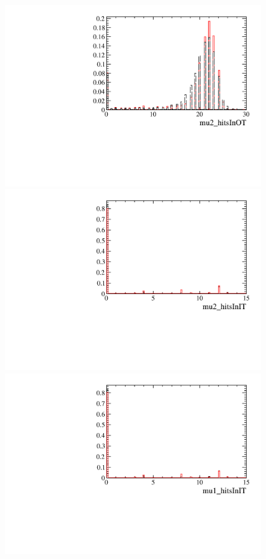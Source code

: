 \documentclass[12pt,a4paper]{article}
\begin{document}
\begin{figure} [htb!]
\begin{center}
\includegraphics[scale=0.20]{figs/mu2_hitsInOTPARTIALptcut.pdf}
\includegraphics[scale=0.20]{figs/mu2_hitsInITPARTIALptcut.pdf}
\includegraphics[scale=0.20]{figs/mu1_hitsInITPARTIALptcut.pdf}

\end{center}
\end{figure}
\end{document}
